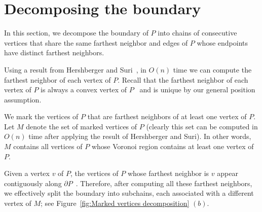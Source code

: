 \documentclass[a4paper,UKenglish]{lipics}
\begin{document}
\section{Decomposing the boundary}\label{Section:Decomposing the boundary}
In this section, we decompose the boundary of $P$ into chains of consecutive vertices that share the same farthest neighbor and edges of $P$ whose endpoints have distinct farthest neighbors.

Using a result from Hershberger and Suri~\cite{hershberger1993matrix}, in $O(n)$ time we can compute the farthest neighbor of each vertex of $P$.
Recall that the farthest neighbor of each vertex of $P$ is always a convex vertex of $P$~\cite{at-cgcsp-85} and is unique by our general position assumption. 

We mark the vertices of $P$ that are farthest neighbors of at least one vertex of $P$. Let $M$ denote the set of marked vertices of $P$ (clearly this set can be computed in $O(n)$ time after applying the result of Hershberger and Suri).
In other words, $M$ contains all vertices of $P$ whose Voronoi region contains at least one vertex of $P$.

Given a vertex $v$ of $P$, the vertices of $P$ whose farthest neighbor is $v$ appear contiguously along $\partial P$~\cite{aronov1993furthest}. Therefore, after computing all these farthest neighbors, we effectively split the boundary into subchains, each associated with a different vertex of $M$; see Figure~\ref{fig:Marked vertices decomposition} $(b)$.
\end{document}
